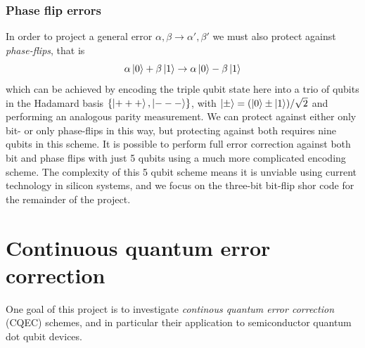 \documentclass{report}
\begin{document}
\subsubsection{Phase flip errors}

In order to project a general error $\alpha, \beta \rightarrow \alpha', \beta'$ we must also protect against \textit{phase-flips}, that is 
\begin{equation}
    \alpha\ket{0} + \beta\ket{1} \rightarrow \alpha\ket{0} - \beta\ket{1}
\end{equation}
which can be achieved by encoding the triple qubit state here into a trio of qubits in the Hadamard basis $\{\ket{+++},\ket{---}\}$, with $\ket{\pm} = (\ket{0} \pm \ket{1})/\sqrt{2}$ and performing an analogous parity measurement. We can protect against either only bit- or only phase-flips in this way, but protecting against both requires nine qubits in this scheme. It is possible to perform full error correction against both bit and phase flips with just 5 qubits  using a much more complicated encoding scheme\cite{DiVincenzo1996}. The complexity of this 5 qubit scheme means it is unviable using current technology in silicon systems, and we focus on the three-bit bit-flip shor code for the remainder of the project.


\section{Continuous quantum error correction}\label{sec:CQEC}
One goal of this project is to investigate \textit{continous quantum error correction} (CQEC) schemes, and in particular their application to semiconductor quantum dot qubit devices. 
\end{document}
